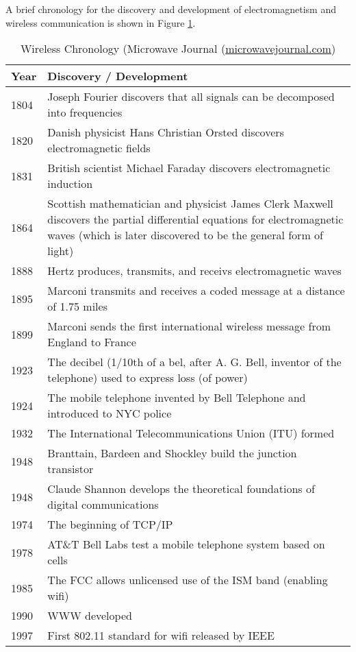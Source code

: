 A brief chronology for the discovery and development of electromagnetism and wireless
communication is shown in Figure \ref{chronology}.
\begin{table}
\begin{tabular}{|l|p{12cm}|}
\hline
\bf Year & \bf Discovery / Development \\
\hline
1804 & Joseph Fourier discovers that all signals can be decomposed into frequencies \\
1820 & Danish physicist Hans Christian Orsted discovers electromagnetic fields \\
1831 & British scientist Michael Faraday discovers electromagnetic induction \\
1864 & Scottish mathematician and physicist James Clerk Maxwell discovers the partial differential equations for electromagnetic waves
	(which is later discovered to be the general form of light)\\
1888 & Hertz produces, transmits, and receivs electromagnetic waves \\
1895 & Marconi transmits and receives a coded message at a distance of 1.75 miles \\
1899 & Marconi sends the first international wireless message from England to France\\
1923 & The decibel (1/10th of a bel, after A. G. Bell, inventor of the telephone) used to express loss (of power) \\
1924 & The mobile telephone invented by Bell Telephone and introduced to NYC police \\
1932 & The International Telecommunications Union (ITU) formed \\
1948 & Branttain, Bardeen and Shockley build the junction transistor\\
1948 & Claude Shannon develops the theoretical foundations of digital communications \\
1974 & The beginning of TCP/IP\\
1978 & AT\&T Bell Labs test a mobile telephone system based on cells\\
1985 & The FCC allows unlicensed use of the ISM band (enabling wifi) \\
1990 & WWW developed\\
1997 & First 802.11 standard for wifi released by IEEE \\
\hline
\end{tabular}
	\caption{Wireless Chronology (Microwave Journal (\url{microwavejournal.com})}\label{chronology}
\end{table}

